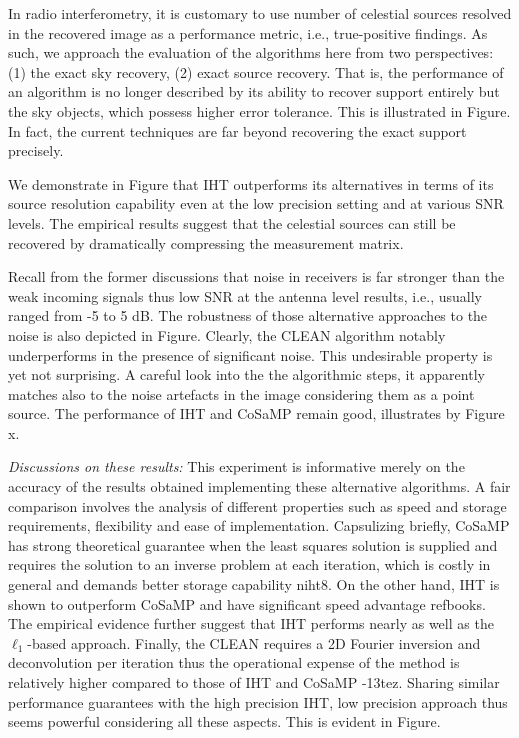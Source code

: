\documentclass{article}
\begin{document}
In radio interferometry, it is customary to use number of celestial sources resolved in the recovered image as a performance metric, i.e., true-positive findings. As such, we approach the evaluation of the algorithms here from two perspectives: (1) the exact sky recovery, (2) exact source recovery. That is, the performance of an algorithm is no longer described by its ability to recover support entirely but the sky objects, which possess higher error tolerance. This is illustrated in Figure. In fact, the current techniques are far beyond recovering the exact support precisely.

We demonstrate in Figure that IHT outperforms its alternatives in terms of its source resolution capability even at the low precision setting and at various SNR levels. The empirical results suggest that the celestial sources can still be recovered by dramatically compressing the measurement matrix.

Recall from the former discussions that noise in receivers is far stronger than the weak incoming signals thus low SNR at the antenna level results, i.e., usually ranged from -5 to 5 dB. The robustness of those alternative approaches to the noise is also depicted in Figure. Clearly, the CLEAN algorithm notably underperforms in the presence of significant noise. This undesirable property is yet not surprising. A careful look into the the algorithmic steps, it apparently matches also to the noise artefacts in the image considering them as a point source. The performance of IHT and CoSaMP remain good, illustrates by Figure x.


{\it Discussions on these results:} This experiment is informative merely on the accuracy of the results obtained implementing these alternative algorithms. A fair comparison involves the analysis of different properties such as speed and storage requirements, flexibility and ease of implementation. Capsulizing briefly, CoSaMP has strong theoretical guarantee when the least squares solution is supplied and requires the solution to an inverse problem at each iteration, which is costly in general and demands better storage capability niht8. On the other hand, IHT is shown to outperform CoSaMP and have significant speed advantage refbooks. The empirical evidence further suggest that IHT performs nearly as well as the $\ell_1$-based approach. Finally, the CLEAN requires a 2D Fourier inversion and deconvolution per iteration thus the operational expense of the method is relatively higher compared to those of IHT and CoSaMP -13tez. Sharing similar performance guarantees with the high precision IHT, low precision approach thus seems powerful considering all these aspects. This is evident in Figure.
\end{document}
